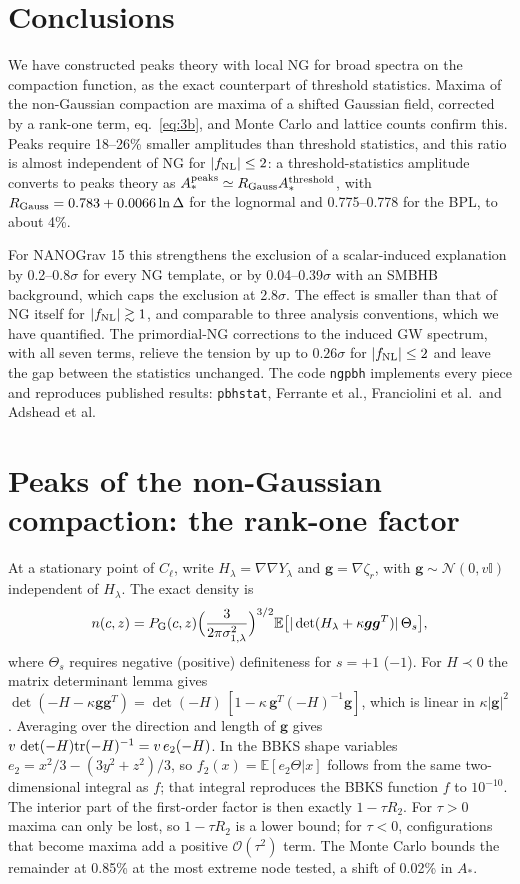 \documentclass[a4paper,11pt]{article}
\newcommand{\Cl}{C_{\ell}}
\newcommand{\zr}{\zeta_r}
\newcommand{\E}{\mathbb{E}}
\newcommand{\fnl}{f_{\rm NL}}
\begin{document}
\section{Conclusions}\label{sec:concl}

We have constructed peaks theory with local NG for broad spectra on the compaction function, as
the exact counterpart of threshold statistics. Maxima of the non-Gaussian compaction are maxima of
a shifted Gaussian field, corrected by a rank-one term, eq.~\eqref{eq:3b}, and Monte Carlo and
lattice counts confirm this. Peaks require 18--26\% smaller amplitudes than threshold statistics,
and this ratio is almost independent of NG for $|\fnl|\le2$: a threshold-statistics amplitude
converts to peaks theory as $A_*^{\rm peaks}\simeq R_{\rm Gauss}A_*^{\rm threshold}$, with
$R_{\rm Gauss}=0.783+0.0066\ln\Delta$ for the lognormal and 0.775--0.778 for the BPL, to about 4\%.

For NANOGrav 15 this strengthens the exclusion of a scalar-induced explanation by
0.2--0.8$\sigma$ for every NG template, or by 0.04--0.39$\sigma$ with an SMBHB background, which
caps the exclusion at 2.8$\sigma$. The effect is smaller than that of NG itself for
$|\fnl|\gtrsim1$, and comparable to three analysis conventions, which we have quantified. The
primordial-NG corrections to the induced GW spectrum, with all seven terms, relieve the tension by
up to $0.26\sigma$ for $|\fnl|\le2$ and leave the gap between the statistics unchanged. The code
\texttt{ngpbh} implements every piece and reproduces published results: \texttt{pbhstat}, Ferrante
et al., Franciolini et al.\ and Adshead et al.

\appendix

\section{Peaks of the non-Gaussian compaction: the rank-one factor}\label{app:3b}

At a stationary point of $\Cl$, write $H_\lambda=\nabla\nabla Y_\lambda$ and $\bm g=\nabla\zr$,
with $\bm g\sim\mathcal N(0,v\mathbb I)$ independent of $H_\lambda$. The exact density is
\begin{equation}
n(c,z)=P_{\rm G}(c,z)\Big(\frac{3}{2\pi\sigma^2_{1,\lambda}}\Big)^{3/2}
\E\big[|\det(H_\lambda+\kappa\bm g\bm g^T)|\,\Theta_s\big],
\end{equation}
where $\Theta_s$ requires negative (positive) definiteness for $s=+1$ ($-1$). For $H\prec0$ the
matrix determinant lemma gives
$\det(-H-\kappa\bm g\bm g^T)=\det(-H)\,[1-\kappa\,\bm g^T(-H)^{-1}\bm g]$, which is linear in
$\kappa|\bm g|^2$. Averaging over the direction and length of $\bm g$ gives
$v\,\det(-H){\rm tr}(-H)^{-1}=v\,e_2(-H)$. In the BBKS shape variables $e_2=x^2/3-(3y^2+z^2)/3$,
so $f_2(x)=\E[e_2\Theta|x]$ follows from the same two-dimensional integral as $f$; that integral
reproduces the BBKS function $f$ to $10^{-10}$. The interior part of the first-order factor is
then exactly $1-\tau R_2$. For $\tau>0$ maxima can only be lost, so $1-\tau R_2$ is a lower bound;
for $\tau<0$, configurations that become maxima add a positive $\mathcal O(\tau^2)$ term. The
Monte Carlo bounds the remainder at 0.85\% at the most extreme node tested, a shift of 0.02\% in
$A_*$.
\end{document}
